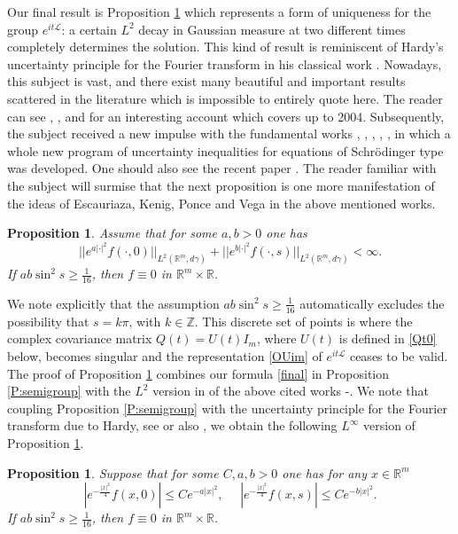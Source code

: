 \documentclass[11pt,a4paper]{amsart}
\def \R {\mathbb{R}}
\newcommand{\Rm}{\mathbb R^m}
\numberwithin{equation}{section}
\newtheorem{proposition}[theorem]{Proposition}
\numberwithin{equation}{section}
\begin{document}
Our final result is Proposition \ref{P:main} which represents a form of uniqueness for the group $e^{i t \mathscr L}$: a certain $L^2$ decay in Gaussian measure at two different times completely determines the solution. This kind of result is reminiscent of Hardy's uncertainty principle for the Fourier transform in his classical work \cite{Ha}. Nowadays, this subject is vast, and there exist many beautiful and important results scattered in the literature which is impossible to entirely quote here. The reader can see \cite{CP}, \cite{SST}, \cite{Fo} and \cite{Veluma} for an interesting account which covers up to 2004. Subsequently, the subject received a new impulse with the fundamental works \cite{EKPVcpde}, \cite{EKPVjems}, \cite{EKPVduke}, \cite{CEKPV}, \cite{EKPVjlms}, in which a whole new program of uncertainty inequalities for equations of Schr\"odinger type was developed. One should also see  the recent paper \cite{FM}. The reader familiar with the subject will surmise that the next proposition is one more manifestation of the ideas of Escauriaza, Kenig, Ponce and Vega in the above mentioned works. 

\begin{proposition}\label{P:main}
Assume that for some $a, b>0$ one has
\begin{equation}\label{L2}
||e^{a|\cdot|^2} f(\cdot,0)||_{L^2(\Rm, d\gamma)} + ||e^{b|\cdot|^2}  f(\cdot,s)||_{L^2(\Rm,d\gamma)}<\infty.
\end{equation}
If $a b \sin^2 s  \ge \frac{1}{16}$, then $f\equiv 0$ in $\Rm\times \R$. 
\end{proposition}

We note explicitly that the assumption $a b \sin^2 s\ge \frac{1}{16}$ automatically excludes the possibility that $s = k \pi$, with $k\in \mathbb Z$. This discrete set of points is where the complex covariance matrix $Q(t) = U(t) I_m$, where $U(t)$ is defined in \eqref{Qt0} below, becomes singular and the representation \eqref{OUim} of $e^{it\mathscr L}$ ceases to be valid. The proof of Proposition \ref{P:main} combines our formula \eqref{final} in Proposition \ref{P:semigroup} with the  $L^2$ version in \cite{CEKPV} of the above cited works \cite{EKPVcpde}-\cite{EKPVjlms}. We note that coupling Proposition \ref{P:semigroup} with the uncertainty principle for the Fourier transform due to Hardy, see \cite{Ha} or also \cite[Theorem 1.2]{CEKPV}, we obtain the following $L^\infty$ version of Proposition \ref{P:main}. 

\begin{proposition}\label{P:main2}
Suppose that for some $C, a, b>0$ one has for any $x\in \Rm$
\begin{equation}\label{Linfty}
|e^{-\frac{|x|^2}4}f(x,0)| \le C e^{-a|x|^2},\ \ \ \ \ \  |e^{-\frac{|x|^2}4} f(x,s)| \le  C e^{-b|x|^2}.
\end{equation}
If $a b \sin^2 s  \ge \frac{1}{16}$, then $f\equiv 0$ in $\Rm\times \R$. 
\end{proposition}
\end{document}
